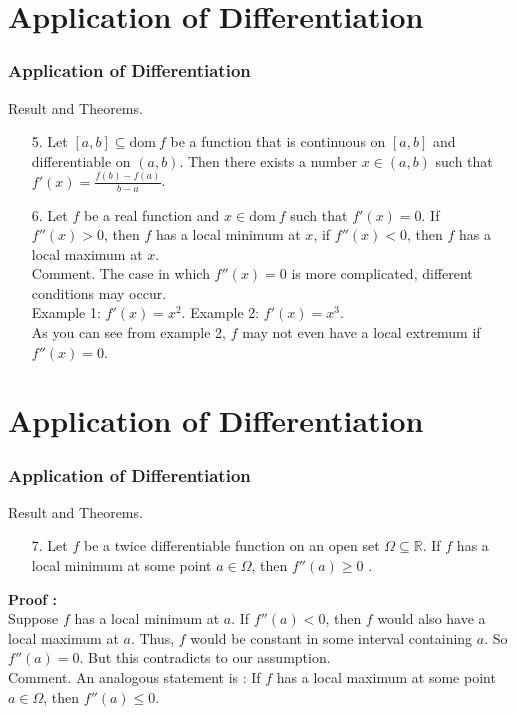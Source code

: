 \documentclass[12pt, t]{beamer}
\begin{document}
\section{Application of Differentiation}
\begin{frame}
    \frametitle{Application of Differentiation}
Result and Theorems.\\
\begin{enumerate}
    \item[5.] Let $[a,b]\subseteq\text{dom}\ f$ be a function that is continuous on $[a,b]$ and differentiable on $(a,b)$.
        Then there exists a number $x\in(a,b)$ such that $f'(x)=\frac{f(b)-f(a)}{b-a}$.
    \vspace{0.5em}
    \item[6.] Let $f$ be a real function and $x\in \text{dom}\ f$ such that $f'(x)=0$. If $f''(x)>0$, then $f$ has a local minimum at $x$, 
        if $f''(x)<0$, then $f$ has a local maximum at $x$.\\
    \vspace{0.3em}
    Comment. The case in which $f''(x)=0$ is more complicated, different conditions may occur.\\
    \hspace{1em}Example 1: $f'(x)=x^2$.    
    \hspace{1em}Example 2: $f'(x)=x^3$.\\
    As you can see from example 2, $f$ may not even have a local extremum if $f''(x)=0$.

\end{enumerate}


\end{frame}

\section{Application of Differentiation}
\begin{frame}
    \frametitle{Application of Differentiation}
Result and Theorems.\\
\begin{enumerate}
    \item[7.] Let $f$ be a twice differentiable function on an open set $\Omega\subseteq \mathbb{R}$. 
        If $f$ has a local minimum at some point $a\in \Omega$, then $f''(a)\geq 0$ .
\end{enumerate}
\textbf{Proof : }\\
\hspace{1em} Suppose $f$ has a local minimum at $a$. If $f''(a)<0$, then $f$ would also have a local maximum at $a$. 
Thus, $f$ would be constant in some interval containing $a$. So $f''(a)=0$. But this contradicts to our assumption.\\
\vspace{2em}
Comment. An analogous statement is : If $f$ has a local maximum at some point $a\in\Omega$, then $f''(a)\leq 0$.

\end{frame}
\end{document}

